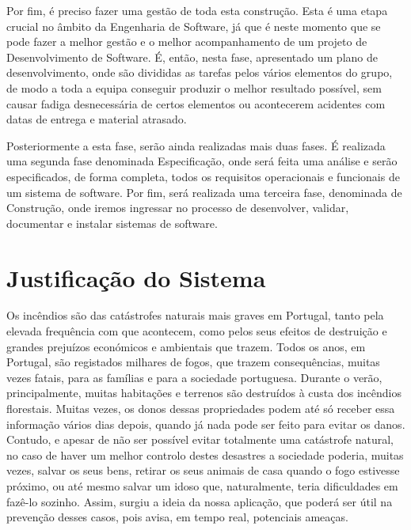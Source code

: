 \documentclass[a4paper,12pt]{scrreprt}
\newcommand{\tab}{
    \hspace{1cm}}
\begin{document}
        \tab Por fim, é preciso fazer uma gestão de toda esta construção. Esta é uma etapa crucial no âmbito da Engenharia de Software, já que é neste momento que se pode fazer a melhor gestão e o melhor acompanhamento de um projeto de Desenvolvimento de Software. É, então, nesta fase, apresentado um plano de desenvolvimento, onde são divididas as tarefas pelos vários elementos do grupo, de modo a toda a equipa conseguir produzir o melhor resultado possível, sem causar fadiga desnecessária de certos elementos ou acontecerem acidentes com datas de entrega e material atrasado.
        
        \tab Posteriormente a esta fase, serão ainda realizadas mais duas fases. É realizada uma segunda fase denominada Especificação, onde será feita uma análise e serão especificados, de forma completa, todos os requisitos operacionais e funcionais de um sistema de software. Por fim, será realizada uma terceira fase, denominada de Construção, onde iremos ingressar no processo de desenvolver, validar, documentar e instalar sistemas de software.
        
    \section{Justificação do Sistema}
        \tab Os incêndios são das catástrofes naturais mais graves em Portugal, tanto pela elevada frequência com que acontecem, como pelos seus efeitos de destruição e grandes prejuízos económicos e ambientais que trazem. Todos os anos, em Portugal, são registados milhares de fogos, que trazem consequências, muitas vezes fatais, para as famílias e para a sociedade portuguesa. Durante o verão, principalmente, muitas habitações e terrenos são destruídos à custa dos incêndios florestais. Muitas vezes, os donos dessas propriedades podem até só receber essa informação vários dias depois, quando já nada pode ser feito para evitar os danos. Contudo, e apesar de não ser possível evitar totalmente uma catástrofe natural, no caso de haver um melhor controlo destes desastres a sociedade poderia, muitas vezes, salvar os seus bens, retirar os seus animais de casa quando o fogo estivesse próximo, ou até mesmo salvar um idoso que, naturalmente, teria dificuldades em fazê-lo sozinho. Assim, surgiu a ideia da nossa aplicação, que poderá ser útil na prevenção desses casos, pois avisa, em tempo real, potenciais ameaças.
\end{document}
